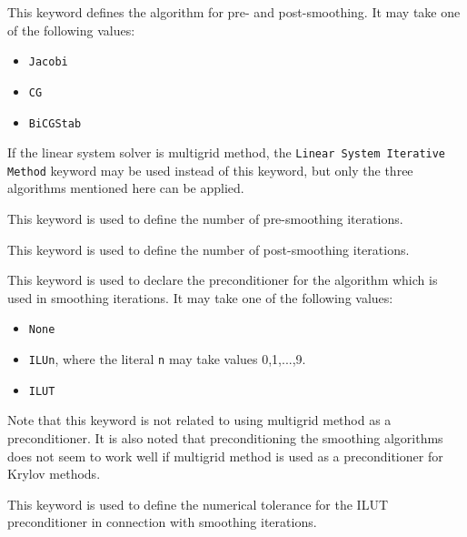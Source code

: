 This keyword defines the algorithm for pre- and  
post-smoothing. It may take one of the following values:
\begin{itemize}
\item {\tt Jacobi}
\item {\tt CG}
\item {\tt BiCGStab}
\end{itemize}
If the linear system solver is multigrid method,
the {\tt Linear System Iterative Method} keyword may be used instead of this keyword, 
but only the three algorithms mentioned here can be applied.

This keyword is used to define the number of pre-smoothing iterations.

This keyword is used to define the number of post-smoothing iterations.

This keyword is used to declare the preconditioner for the algorithm which is used in
smoothing iterations. It may take one of the following values:
\begin{itemize}
\item {\tt None}
\item {\tt ILUn}, where the literal {\tt n} may take values 0,1,...,9.
\item {\tt ILUT}
\end{itemize}
Note that this keyword is not related to using multigrid method as a preconditioner. 
It is also noted that preconditioning the smoothing algorithms 
does not seem to work well if multigrid method is used as a preconditioner for 
Krylov methods.

This keyword is used to define the numerical tolerance for the ILUT preconditioner 
in connection with smoothing iterations.

\sifend

